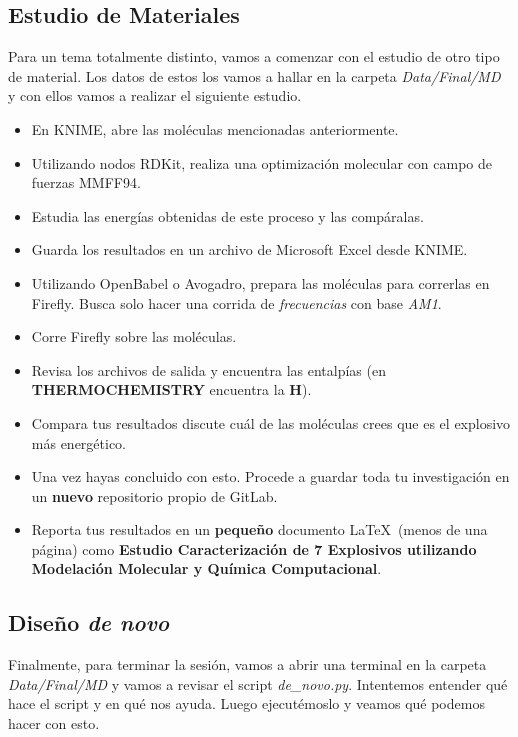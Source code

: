 \documentclass[10pt,letterpaper]{article}
\begin{document}
\subsection{Estudio de Materiales}
Para un tema totalmente distinto, vamos a comenzar con el estudio de otro tipo de material. Los datos de estos los vamos a hallar en la carpeta \textit{Data/Final/MD} y con ellos vamos a realizar el siguiente estudio.

\begin{itemize}
\item En KNIME, abre las mol\'eculas mencionadas anteriormente.
\item Utilizando nodos RDKit, realiza una optimizaci\'on molecular con campo de fuerzas MMFF94.
\item Estudia las energ\'ias obtenidas de este proceso y las comp\'aralas.
\item Guarda los resultados en un archivo de Microsoft Excel desde KNIME.
\item Utilizando OpenBabel o Avogadro, prepara las mol\'eculas para correrlas en Firefly. Busca solo hacer una corrida de \emph{frecuencias} con base \emph{AM1}.
\item Corre Firefly sobre las mol\'eculas.
\item Revisa los archivos de salida y encuentra las entalp\'ias (en \textbf{THERMOCHEMISTRY} encuentra la \textbf{H}).
\item Compara tus resultados discute cu\'al de las mol\'eculas crees que es el explosivo m\'as energ\'etico.
\item Una vez hayas concluido con esto. Procede a guardar toda tu investigaci\'on en un \textbf{nuevo} repositorio propio de GitLab.
\item Reporta tus resultados en un \textbf{peque\~no} documento \LaTeX\ (menos de una p\'agina) como \textbf{Estudio Caracterizaci\'on de 7 Explosivos utilizando Modelaci\'on Molecular y Qu\'imica Computacional}.
\end{itemize}

\subsection{Dise\~no \emph{de novo}}
Finalmente, para terminar la sesi\'on, vamos a abrir una terminal en la carpeta \textit{Data/Final/MD} y vamos a revisar el script \textit{de\_novo.py}. Intentemos entender qu\'e hace el script y en qu\'e nos ayuda. Luego ejecut\'emoslo y veamos qu\'e podemos hacer con esto.
\end{document}
